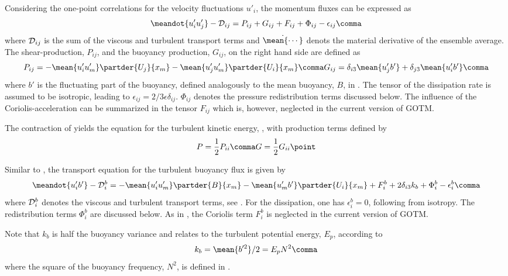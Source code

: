  Considering the one-point correlations for the velocity fluctuations
 $u'_i$, the momentum fluxes can be expressed as
\begin{equation}
  \label{momentumFlux}
  \meandot{u'_i u'_j} - {\cal D}_{ij} = 
  P_{ij} + G_{ij} + F_{ij} + \Phi_{ij} - \epsilon_{ij}
  \comma 
\end{equation}
where ${\cal D}_{ij}$ is the sum of the viscous and turbulent
transport terms and $\dot{\mean{\cdots}}$ denots the material derivative
of the ensemble average. The shear-production, $P_{ij}$, and the
buoyancy production, $G_{ij}$, on the right hand side are defined as
\begin{equation}
  \label{PijandGij}
  P_{ij} = - \mean{u'_i u'_m} \partder{U_j}{x_m} - \mean{u'_j u'_m} \partder{U_i}{x_m} \comma
  G_{ij} =  \delta_{i3} \mean{u'_j b'}  +  \delta_{j3} \mean{u'_i b'} \comma
\end{equation}
where $b'$ is the fluctuating part of the buoyancy, defined
analogously to the mean buoyancy, $B$, in . The tensor
of the dissipation rate is assumed to be isotropic, leading to
$\epsilon_{ij} = 2/3 \epsilon \delta_{ij}$. $\Phi_{ij}$ denotes the
pressure redistribution terms discussed below. The influence of the
Coriolis-acceleration can be summarized in the tensor $F_{ij}$ which
is, however, neglected in the current version of GOTM.

The contraction of  yields the equation for the
turbulent kinetic energy, , with production terms
defined by 
\begin{equation}
  \label{PG}
   P = \dfrac{1}{2} P_{ii} \comma G = \dfrac{1}{2} G_{ii}
  \point
\end{equation}

Similar to , the transport equation for the turbulent 
buoyancy flux is given by
\begin{equation}
  \label{buoyancyFlux}
  \meandot{u'_i b'} - {\cal D}^b_{i} =  
  - \mean{u'_i u'_m} \partder{B}{x_m} - \mean{u'_m b'} \partder{U_i}{x_m} 
  + F^b_i + 2 \delta_{i3} k_b + \Phi^b_i - \epsilon^b_{i} 
  \comma
\end{equation}
where $ {\cal D}^b_{i}$ denotes the viscous and turbulent transport
terms, see \cite{Sander98a}. For the dissipation, one has
$\epsilon^b_{i}=0$, following from isotropy. The redistribution terms
$\Phi^b_i$ are discussed below. As in , the Coriolis term
$F^b_i$ is neglected in the current version of GOTM.

Note that $k_b$ is half the buoyancy variance and relates to the
turbulent potential energy, $E_p$, according to
\begin{equation}
  \label{defkb}
    k_b = \mean{b'^2}/2 = E_p N^2 
   \comma	
\end{equation}
where the square of the buoyancy frequency, $N^2$, is defined in
. 


